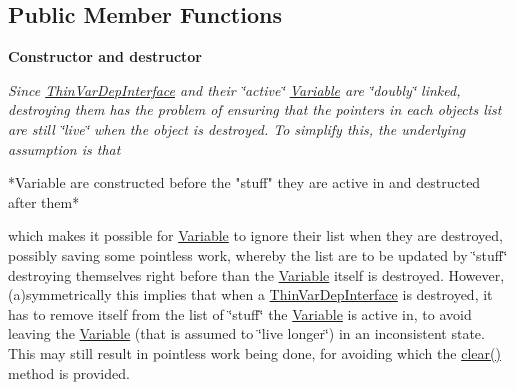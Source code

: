 \subsection*{Public Member Functions}
\begin{Indent}\textbf{ Constructor and destructor}\par
{\em Since \mbox{\hyperlink{class_s_m_spp__di__unipi__it_1_1_thin_var_dep_interface}{Thin\+Var\+Dep\+Interface}} and their \char`\"{}active\char`\"{} \mbox{\hyperlink{class_s_m_spp__di__unipi__it_1_1_variable}{Variable}} are \char`\"{}doubly\char`\"{} linked, destroying them has the problem of ensuring that the pointers in each object\textquotesingle{}s list are still \char`\"{}live\char`\"{} when the object is destroyed. To simplify this, the underlying assumption is that \begin{DoxyVerb}*Variable are constructed before the "stuff" they are active
 in and destructed after them*
\end{DoxyVerb}


which makes it possible for \mbox{\hyperlink{class_s_m_spp__di__unipi__it_1_1_variable}{Variable}} to ignore their list when they are destroyed, possibly saving some pointless work, whereby the list are to be updated by \char`\"{}stuff\char`\"{} destroying themselves right before than the \mbox{\hyperlink{class_s_m_spp__di__unipi__it_1_1_variable}{Variable}} itself is destroyed. However, (a)symmetrically this implies that when a \mbox{\hyperlink{class_s_m_spp__di__unipi__it_1_1_thin_var_dep_interface}{Thin\+Var\+Dep\+Interface}} is destroyed, it has to remove itself from the list of \char`\"{}stuff\char`\"{} the \mbox{\hyperlink{class_s_m_spp__di__unipi__it_1_1_variable}{Variable}} is active in, to avoid leaving the \mbox{\hyperlink{class_s_m_spp__di__unipi__it_1_1_variable}{Variable}} (that is assumed to \char`\"{}live longer\char`\"{}) in an inconsistent state. This may still result in pointless work being done, for avoiding which the \mbox{\hyperlink{group___thin_var_dep_interface___c_l_a_s_s_e_s_gae16067de85b435fac4ce8558b193a99a}{clear()}} method is provided.

}
\end{Indent}
